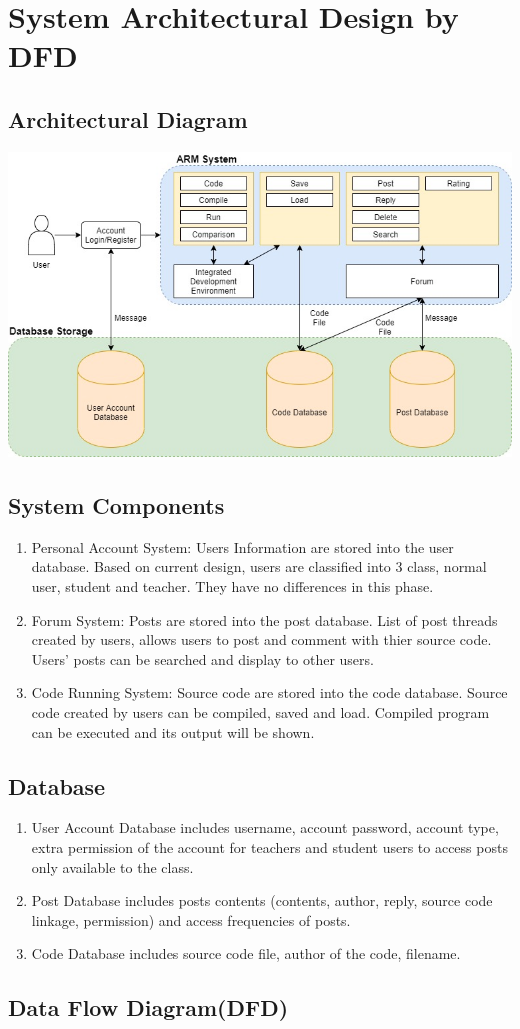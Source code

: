 \chapter{System Architectural Design by DFD}
\section{Architectural Diagram}
\includegraphics[scale=0.5]{Doc/Pics/architectural_diagram}
\newpage
\section{System Components}
\begin{enumerate}
	\item Personal Account System: Users Information are stored into the user database. Based on current design, users are classified into 3 class, normal user, student and teacher. They have no differences in this phase.
	\item Forum System: Posts are stored into the post database. List of post threads created by users, allows users to post and comment with thier source code. Users' posts can be searched and display to other users.
	\item Code Running System: Source code are stored into the code database. Source code created by users can be compiled, saved and load. Compiled program can be executed and its output will be shown.
\end{enumerate}
\section{Database}
\begin{enumerate}
	\item User Account Database includes username, account password, account type, extra permission of the account for teachers and student users to access posts only available to the class.
	\item Post Database includes posts contents (contents, author, reply, source code linkage, permission) and access frequencies of posts.
  \item Code Database includes source code file, author of the code, filename.
\end{enumerate}
\section{Data Flow Diagram(DFD)}
